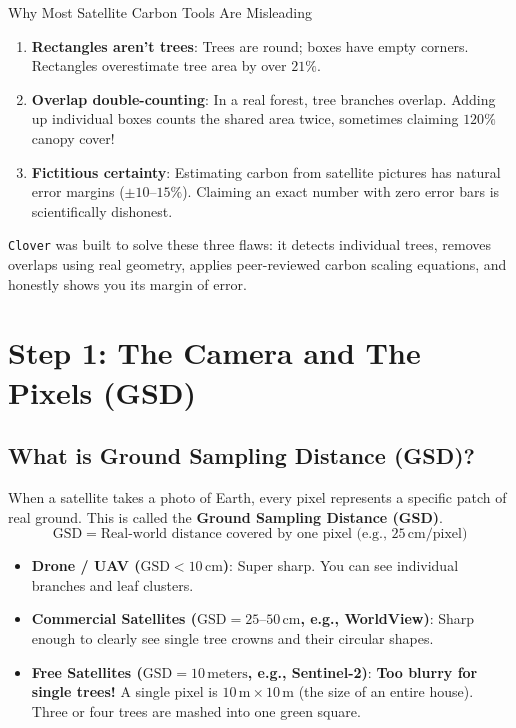 \documentclass[11pt,a4paper]{article}
\begin{document}
\begin{alertbox}{Why Most Satellite Carbon Tools Are Misleading}
\begin{enumerate}
    \item \textbf{Rectangles aren't trees}: Trees are round; boxes have empty corners. Rectangles overestimate tree area by over $21\%$.
    \item \textbf{Overlap double-counting}: In a real forest, tree branches overlap. Adding up individual boxes counts the shared area twice, sometimes claiming $120\%$ canopy cover!
    \item \textbf{Fictitious certainty}: Estimating carbon from satellite pictures has natural error margins ($\pm 10\text{--}15\%$). Claiming an exact number with zero error bars is scientifically dishonest.
\end{enumerate}
\end{alertbox}

\texttt{Clover} was built to solve these three flaws: it detects individual trees, removes overlaps using real geometry, applies peer-reviewed carbon scaling equations, and honestly shows you its margin of error.

\section{Step 1: The Camera and The Pixels (GSD)}

\subsection{What is Ground Sampling Distance (GSD)?}
When a satellite takes a photo of Earth, every pixel represents a specific patch of real ground. This is called the \textbf{Ground Sampling Distance (GSD)}.
\begin{equation}
\text{GSD} = \text{Real-world distance covered by one pixel (e.g., } 25\,\text{cm/pixel)}
\end{equation}

\begin{itemize}
    \item \textbf{Drone / UAV ($\text{GSD} < 10\,\text{cm}$)}: Super sharp. You can see individual branches and leaf clusters.
    \item \textbf{Commercial Satellites ($\text{GSD} = 25\text{--}50\,\text{cm}$, e.g., WorldView)}: Sharp enough to clearly see single tree crowns and their circular shapes.
    \item \textbf{Free Satellites ($\text{GSD} = 10\,\text{meters}$, e.g., Sentinel-2)}: \textbf{Too blurry for single trees!} A single pixel is $10\,\text{m} \times 10\,\text{m}$ (the size of an entire house). Three or four trees are mashed into one green square.
\end{itemize}
\end{document}
